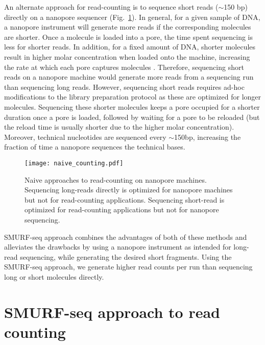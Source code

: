 An alternate approach for read-counting is to sequence short reads
($\sim$150 bp) directly on a nanopore sequencer
(Fig.~\ref{naive_counting}).
In general, for a given sample of DNA, a nanopore instrument will
generate more reads if the corresponding molecules are shorter.  Once a
molecule is loaded into a pore, the time spent sequencing is less for
shorter reads. In addition, for a fixed amount of DNA, shorter molecules
result in higher molar concentration when loaded onto the machine,
increasing the rate at which each pore captures molecules
\citep{muthukumar2010theory,wanunu2008dna}. Therefore, sequencing short
reads on a nanopore machine would generate more reads from a sequencing
run than sequencing long reads.
However, sequencing short reads requires ad-hoc modifications to the
library preparation protocol as these are optimized for longer
molecules.  Sequencing these shorter molecules keeps a pore occupied for
a shorter duration once a pore is loaded, followed by waiting for a pore
to be reloaded (but the reload time is usually shorter due to the higher
molar concentration). Moreover, technical nucleotides are sequenced
every $\sim$150bp, increasing the fraction of time a nanopore sequences
the technical bases.

\begin{figure}[b!]
\centering
\texttt{[image: naive\_counting.pdf]}
\caption[Naive approaches to read-counting on nanopore machines]{
  Naive approaches to read-counting on nanopore machines.
  Sequencing long-reads directly is optimized for nanopore machines but
  not for read-counting applications.
  Sequencing short-read is optimized for read-counting applications but
  not for nanopore sequencing.}
\label{naive_counting}
\end{figure}

SMURF-seq approach combines the advantages of both of these methods
and alleviates the drawbacks by using a nanopore instrument as
intended for long-read sequencing, while generating the desired short
fragments. Using the SMURF-seq approach, we generate higher read counts
per run than sequencing long or short molecules directly.


\section{SMURF-seq approach to read counting}

